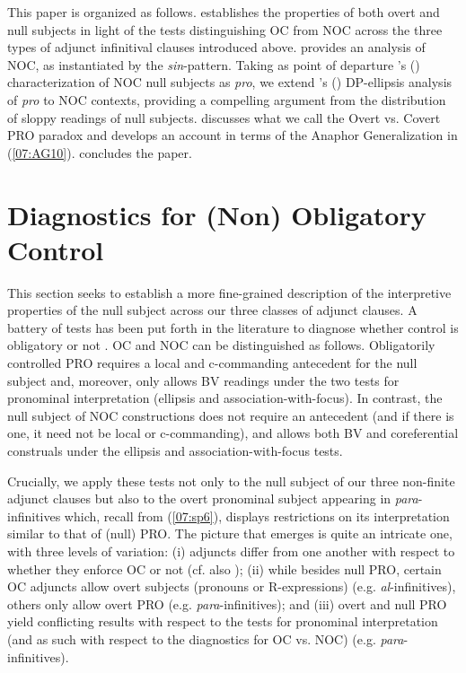 \documentclass[output=paper,colorlinks,citecolor=brown,draft,draftmode]{langscibook}
\begin{document}
\largerpage
This paper is organized as follows.  establishes the properties of both overt and null subjects in light of the tests distinguishing OC from NOC across the three types of adjunct infinitival clauses introduced above.  provides an analysis of NOC, as instantiated by the \textit{sin}-pattern. Taking as point of departure \citeauthor{hornstein99}'s (\citeyear{hornstein99}) characterization of NOC null subjects as \textit{pro}, we extend \citeauthor{duguine13}'s (\citeyear{duguine13, duguine14}) DP-ellipsis analysis of \textit{pro} to NOC contexts, providing a compelling argument from the distribution of sloppy readings of null subjects.  discusses what we call the Overt vs. Covert PRO paradox and develops an account in terms of the Anaphor Generalization in (\ref{07:AG10}).  concludes the paper.

\section{Diagnostics for (Non) Obligatory Control}
\label{07:section2}
This section seeks to establish a more fine-grained description of the interpretive properties of the null subject across our three classes of adjunct clauses. A battery of tests has been put forth in the literature to diagnose whether control is obligatory or not \citep{williams80, hornstein99, landau00, landau13, baltin15}. OC and NOC can be distinguished as follows. Obligatorily controlled PRO requires a local and c-commanding antecedent for the null subject and, moreover, only allows BV readings under the two tests for pronominal interpretation (ellipsis and association-with-focus). In contrast, the null subject of NOC constructions does not require an antecedent (and if there is one, it need not be local or c-commanding), and allows both BV and coreferential construals under the ellipsis and association-with-focus tests.

Crucially, we apply these tests not only to the null subject of our three non-finite adjunct clauses but also to the overt pronominal subject appearing in \textit{para}-infinitives which, recall from (\ref{07:sp6}), displays restrictions on its interpretation similar to that of (null) PRO.
The picture that emerges is quite an intricate one, with three levels of variation: (i) adjuncts differ from one another with respect to whether they enforce OC or not (cf. also \citealt{landau13}); (ii) while besides null PRO, certain OC adjuncts allow overt subjects (pronouns or R-expressions) (e.g.\textit{ al}-infinitives), others only allow overt PRO (e.g. \textit{para}-infinitives); and (iii) overt and null PRO yield conflicting results with respect to the tests for pronominal interpretation (and as such with respect to the diagnostics for OC vs. NOC) (e.g. \textit{para}-infinitives).
\end{document}
